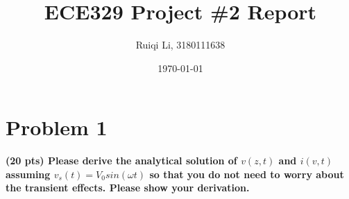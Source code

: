 \documentclass{article}
\title{\textbf{ECE329 Project \#2 Report}}
\author{Ruiqi Li, 3180111638}
\date{\today}
\begin{document}
\renewcommand{\algorithmicrequire}{\textbf{Input:}}  %
\renewcommand{\algorithmicensure}{\textbf{Output:}} %
\newcommand{\algorithmautorefname}{Algorithm} %

\maketitle

\section{Problem 1}

\textbf{(20 pts) Please derive the analytical solution of $v(z, t)$ and $i(v, t)$ assuming $v_s(t) = V_0 sin(\omega t)$ so that you do not need to worry about the transient effects. Please show your derivation. }

    
\end{document}
